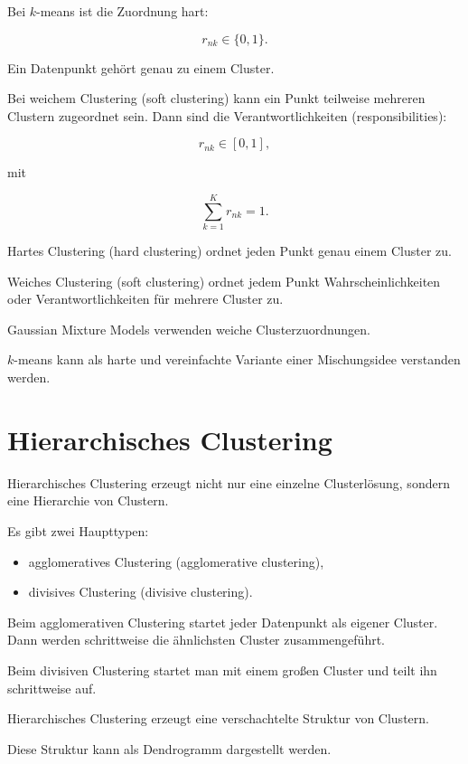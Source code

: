 Bei \(k\)-means ist die Zuordnung hart:

\[
    r_{nk}\in\{0,1\}.
\]

Ein Datenpunkt gehört genau zu einem Cluster.

Bei weichem Clustering (soft clustering) kann ein Punkt teilweise mehreren Clustern zugeordnet sein.
Dann sind die Verantwortlichkeiten (responsibilities):

\[
    r_{nk}\in[0,1],
\]

mit

\[
    \sum_{k=1}^{K}
    r_{nk}
    =
    1.
\]

\begin{definitionbox}
Hartes Clustering (hard clustering) ordnet jeden Punkt genau einem Cluster zu.

Weiches Clustering (soft clustering) ordnet jedem Punkt Wahrscheinlichkeiten oder Verantwortlichkeiten für mehrere Cluster zu.
\end{definitionbox}

\begin{conceptbox}
Gaussian Mixture Models verwenden weiche Clusterzuordnungen.

\(k\)-means kann als harte und vereinfachte Variante einer Mischungsidee verstanden werden.
\end{conceptbox}

\section{Hierarchisches Clustering}

Hierarchisches Clustering erzeugt nicht nur eine einzelne Clusterlösung, sondern eine Hierarchie von Clustern.

Es gibt zwei Haupttypen:

\begin{itemize}
    \item agglomeratives Clustering (agglomerative clustering),
    \item divisives Clustering (divisive clustering).
\end{itemize}

Beim agglomerativen Clustering startet jeder Datenpunkt als eigener Cluster.
Dann werden schrittweise die ähnlichsten Cluster zusammengeführt.

Beim divisiven Clustering startet man mit einem großen Cluster und teilt ihn schrittweise auf.

\begin{definitionbox}
Hierarchisches Clustering erzeugt eine verschachtelte Struktur von Clustern.

Diese Struktur kann als Dendrogramm dargestellt werden.
\end{definitionbox}


